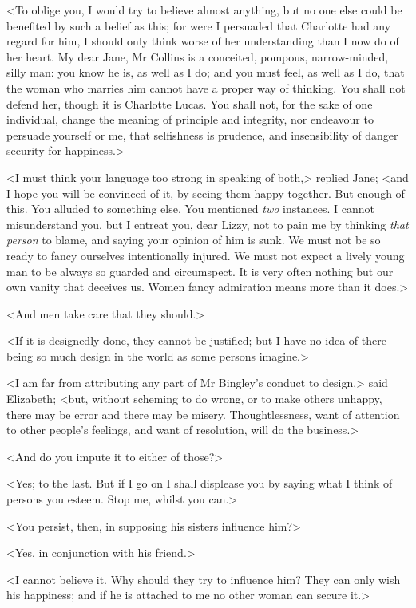 <To oblige you, I would try to believe almost anything, but no one else could be benefited by such a belief as this; for were I persuaded that Charlotte had any regard for him, I should only think worse of her understanding than I now do of her heart. My dear Jane, Mr Collins is a conceited, pompous, narrow-minded, silly man: you know he is, as well as I do; and you must feel, as well as I do, that the woman who marries him cannot have a proper way of thinking. You shall not defend her, though it is Charlotte Lucas. You shall not, for the sake of one individual, change the meaning of principle and integrity, nor endeavour to persuade yourself or me, that selfishness is prudence, and insensibility of danger security for happiness.>

<I must think your language too strong in speaking of both,> replied Jane; <and I hope you will be convinced of it, by seeing them happy together. But enough of this. You alluded to something else. You mentioned \textit{two} instances. I cannot misunderstand you, but I entreat you, dear Lizzy, not to pain me by thinking \textit{that person} to blame, and saying your opinion of him is sunk. We must not be so ready to fancy ourselves intentionally injured. We must not expect a lively young man to be always so guarded and circumspect. It is very often nothing but our own vanity that deceives us. Women fancy admiration means more than it does.>

<And men take care that they should.>

<If it is designedly done, they cannot be justified; but I have no idea of there being so much design in the world as some persons imagine.>

<I am far from attributing any part of Mr Bingley's conduct to design,> said Elizabeth; <but, without scheming to do wrong, or to make others unhappy, there may be error and there may be misery. Thoughtlessness, want of attention to other people's feelings, and want of resolution, will do the business.>

<And do you impute it to either of those?>

<Yes; to the last. But if I go on I shall displease you by saying what I think of persons you esteem. Stop me, whilst you can.>

<You persist, then, in supposing his sisters influence him?>

<Yes, in conjunction with his friend.>

<I cannot believe it. Why should they try to influence him? They can only wish his happiness; and if he is attached to me no other woman can secure it.>


